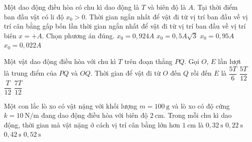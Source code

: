 \begin{ex}
Một dao động điều hòa có chu kì dao động là $T$ và biên độ là $A$. Tại thời điểm ban đầu vật có li độ $x_0\gt 0$. Thời gian ngắn nhất để vật đi từ vị trí ban đầu về vị trí cân bằng gấp bốn lần thời gian ngắn nhất để vật đi từ vị trí ban đầu về vị trí biên $x=+A$. Chọn phương án đúng.
\choice
{$x_0=0{,}924A$}
{$x_0=0,5A\sqrt{3}$}
{\True $x_0=0{,}95A$}
{$x_0=0{,}022A$}
\end{ex}

\begin{ex}
Một vật dao động điều hòa với chu kì $T$ trên đoạn thẳng $PQ$. Gọi $O$, $E$ lần lượt là trung điểm của $PQ$ và $OQ$. Thời gian để vật đi từ $O$ đến $Q$ rồi đến $E$ là
\choice
{$\dfrac{5T}{6}$}
{\True $\dfrac{5T}{12}$}
{$\dfrac{T}{12}$}
{$\dfrac{7T}{12}$}
\end{ex}

\begin{ex}
Một con lắc lò xo có vật nặng với khối lượng $m=100\ \text{g}$ và lò xo có độ cứng $k=10\ \text{N/m}$ đang dao động điều hòa với biên độ $2\ \text{cm}$. Trong mỗi chu kì dao động, thời gian mà vật nặng ở cách vị trí cân bằng lớn hơn $1\ \text{cm}$ là
\choice
{$0,32\ \text{s}$}
{$0,22\ \text{s}$}
{\True $0,42\ \text{s}$}
{$0,52\ \text{s}$}
\end{ex}

